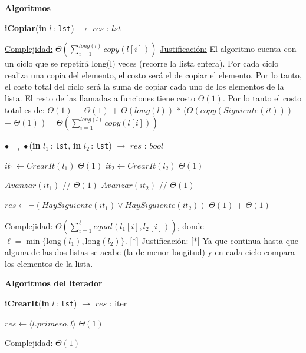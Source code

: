 \documentclass[a4paper,10pt]{article}
\let\TipoVariable=\texttt
\let\ModificadorArgumento=\textbf
\newcommand{\In}[2]{\ModificadorArgumento{in} \ensuremath{#1}\,: \TipoVariable{#2}\xspace}
\newenvironment{Algoritmos}{%
  \vspace*{2ex}%
  \noindent\textbf{\Large Algoritmos}%
  \vspace*{2ex}%
}{}
\newcommand{\Titulo}[1]{
  \vspace*{1ex}\par\noindent\textbf{\large #1}\par
}
\begin{document}
\begin{Algoritmos}
\begin{algorithm}[H]{\textbf{iCopiar}(\In{l}{lst}) $\to$ $res$ : $lst$}
\begin{algorithmic}[1]
		\medskip
		\Statex \underline{Complejidad:} $\Theta\left(\sum_{i=1}^{long(l)}copy({l[i]})\right)$
		\Statex \underline{Justificación:} El algoritmo cuenta con un ciclo que se repetirá long(l) veces (recorre la lista entera). Por cada ciclo realiza una copia del elemento, el costo será el de copiar el elemento. Por lo tanto, el costo total del ciclo será la suma de copiar cada uno de los elementos de la lista. El resto de las llamadas a funciones tiene costo $\Theta(1)$. Por lo tanto el costo total es de: $\Theta(1)$  + $\Theta(1)$ + $\Theta(long(l))$ * ($\Theta(copy(Siguiente(it)))$ + $\Theta(1)$ ) = $\Theta\left(\sum_{i=1}^{long(l)}copy({l[i]})\right)$
    \end{algorithmic}
\end{algorithm}	

	
\begin{algorithm}[H]{\textbf{$\bullet =_i \bullet$}(\In{l_1}{lst}, \In{l_2}{lst}) $\to$ $res$ : $bool$}
	\begin{algorithmic}[1]
			\State $it_1 \gets CrearIt(l_1)$	\Comment $\Theta(1)$
			\State $it_2 \gets CrearIt(l_2)$ 	\Comment $\Theta(1)$
			
			  \Comment [$\ast$]
			 	\State $Avanzar(it_1)$ // $\Theta(1)$
				\State $Avanzar(it_2)$	// $\Theta(1)$
			\EndWhile
			
			\State $res \gets \neg(HaySiguiente(it_1) \lor HaySiguiente(it_2))$	\Comment $\Theta(1)$ + $\Theta(1)$
    	
		\medskip
		\Statex \underline{Complejidad:} $\displaystyle\Theta\left(\sum_{i=1}^{\ell}{equal(l_1[i],l_2[i])}\right)$, donde $\ell = \min\{\text{long}(l_1),\text{long}(l_2)\}$. [$\ast$]
		\Statex \underline{Justificación:} [$\ast$] Ya que continua hasta que alguna de las dos listas se acabe (la de menor longitud) y en cada ciclo compara los elementos de la lista.
    \end{algorithmic}
\end{algorithm}


\Titulo{Algoritmos del iterador}	
 
\begin{algorithm}[H]
	\begin{algorithmic}[1]
		\State \textbf{iCrearIt}(\In{l}{lst}) $\to$ $res$ : iter
		
			\State $res \gets \langle l.primero, l \rangle$ 	\Comment $\Theta(1)$
    	
		\medskip
		\Statex \underline{Complejidad:} $\Theta(1)$
    \end{algorithmic}
\end{algorithm}	


\end{Algoritmos}
\end{document}
